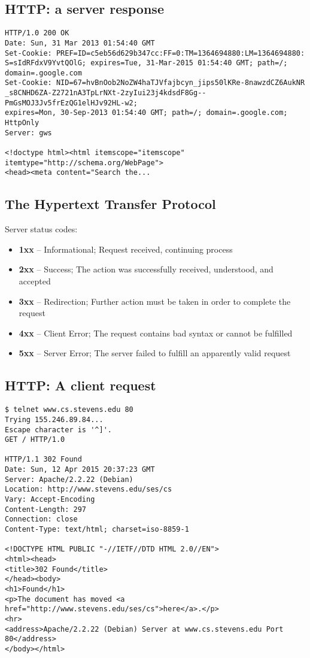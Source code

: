 \documentclass[xga]{xdvislides}
\begin{document}
\subsection{HTTP: a server response}
\begin{verbatim}
HTTP/1.0 200 OK
Date: Sun, 31 Mar 2013 01:54:40 GMT
Set-Cookie: PREF=ID=c5eb56d629b347cc:FF=0:TM=1364694880:LM=1364694880:
S=sIdRFdxV9YvtQOlG; expires=Tue, 31-Mar-2015 01:54:40 GMT; path=/;
domain=.google.com
Set-Cookie: NID=67=hvBnOob2NoZW4haTJVfajbcyn_jips50lKRe-8nawzdCZ6AukNR
_s8CNHD6ZA-Z2721nA3TpLrNXt-2zyIui23j4kdsdF8Gg--PmGsMOJ3Jv5frEzQG1elHJv92HL-w2;
expires=Mon, 30-Sep-2013 01:54:40 GMT; path=/; domain=.google.com; HttpOnly
Server: gws

<!doctype html><html itemscope="itemscope" itemtype="http://schema.org/WebPage">
<head><meta content="Search the...

\end{verbatim}

\subsection{The Hypertext Transfer Protocol}
Server status codes:
\begin{itemize}
	\item {\bf 1xx} -- Informational; Request received, continuing process
	\item {\bf 2xx} -- Success; The action was successfully received,
        understood, and accepted
	\item {\bf 3xx} -- Redirection; Further action must be taken in order to
        complete the request
	\item {\bf 4xx} -- Client Error; The request contains bad syntax or
		cannot be fulfilled
	\item {\bf 5xx} -- Server Error; The server failed to fulfill an
		apparently valid request
\end{itemize}

\subsection{HTTP: A client request}
\smallish
\begin{verbatim}
$ telnet www.cs.stevens.edu 80
Trying 155.246.89.84...
Escape character is '^]'.
GET / HTTP/1.0

HTTP/1.1 302 Found
Date: Sun, 12 Apr 2015 20:37:23 GMT
Server: Apache/2.2.22 (Debian)
Location: http://www.stevens.edu/ses/cs
Vary: Accept-Encoding
Content-Length: 297
Connection: close
Content-Type: text/html; charset=iso-8859-1

<!DOCTYPE HTML PUBLIC "-//IETF//DTD HTML 2.0//EN">
<html><head>
<title>302 Found</title>
</head><body>
<h1>Found</h1>
<p>The document has moved <a href="http://www.stevens.edu/ses/cs">here</a>.</p>
<hr>
<address>Apache/2.2.22 (Debian) Server at www.cs.stevens.edu Port 80</address>
</body></html>
\end{verbatim}
\Normalsize
\end{document}
